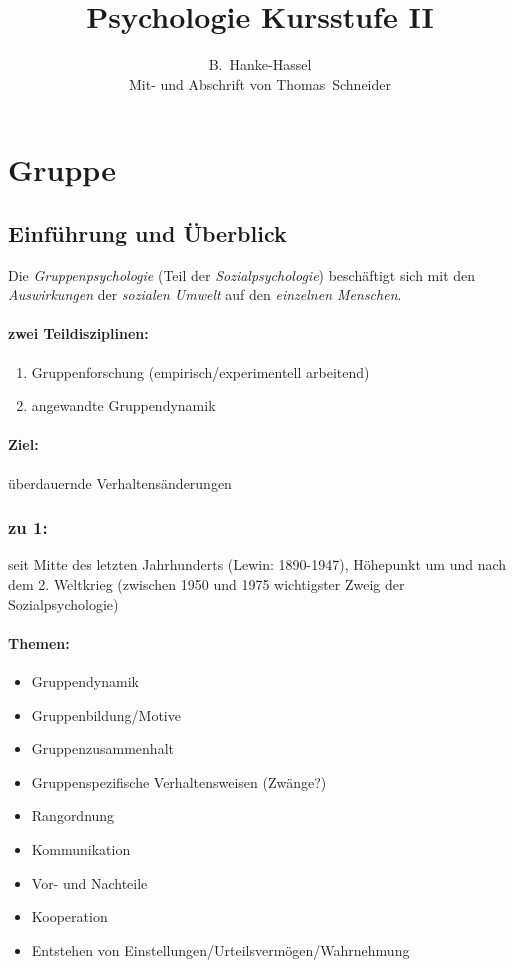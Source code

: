 \documentclass[12pt]{scrartcl}
\title{Psychologie Kursstufe II}
\author{B.~Hanke-Hassel\\Mit- und Abschrift von Thomas~Schneider}
\date{} %
\begin{document}
\maketitle
\tableofcontents \pagebreak

\section{Gruppe}

\subsection{Einführung und Überblick}
Die \emph{Gruppenpsychologie} (Teil der \emph{Sozialpsychologie}) beschäftigt
sich mit den \emph{Auswirkungen} der \emph{sozialen Umwelt} auf den
\emph{einzelnen Menschen}.

\paragraph{zwei Teildisziplinen:}
\begin{enumerate}
	\item Gruppenforschung (empirisch/experimentell arbeitend)
	\item angewandte Gruppendynamik
\end{enumerate}

\paragraph{Ziel:} überdauernde Verhaltensänderungen

\subsubsection*{zu 1:} seit Mitte des letzten Jahrhunderts (Lewin: 1890-1947),
Höhepunkt um und nach dem 2. Weltkrieg (zwischen 1950 und 1975 wichtigster
Zweig der Sozialpsychologie)

\paragraph{Themen:}
\begin{itemize}
	\item Gruppendynamik
	\item Gruppenbildung/Motive
	\item Gruppenzusammenhalt
	\item Gruppenspezifische Verhaltensweisen (Zwänge?)
	\item Rangordnung
	\item Kommunikation
	\item Vor- und Nachteile
	\item Kooperation
	\item Entstehen von Einstellungen/Urteilsvermögen/Wahrnehmung
\end{itemize}
\end{document}
